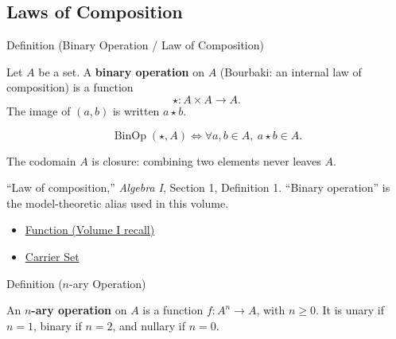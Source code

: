 
\subsection{Laws of Composition}
\label{sec:laws-of-composition}

\begin{definitionbox}{Definition (Binary Operation / Law of Composition)}
\begin{definition}
\label{def:binop}
Let $A$ be a set. A \textbf{binary operation} on $A$ (Bourbaki: an internal
law of composition) is a function
\[
  \star:A\times A\to A.
\]
The image of $(a,b)$ is written $a\star b$.
\end{definition}
\end{definitionbox}

\begin{remark*}
\[
\operatorname{BinOp}(\star,A)\Longleftrightarrow
\forall a,b\in A,\ a\star b\in A.
\]
\end{remark*}

\begin{remark*}[Interpretation]
The codomain $A$ is closure: combining two elements never leaves $A$.
\end{remark*}

\begin{remark*}
``Law of composition,'' \textit{Algebra I}, Section 1, Definition 1.
``Binary operation'' is the model-theoretic alias used in this volume.
\end{remark*}

\begin{dependencies}
\begin{itemize}
  \item \hyperref[def:alg-function]{Function (Volume I recall)}
  \item \hyperref[def:carrier-set]{Carrier Set}
\end{itemize}
\end{dependencies}

\begin{definitionbox}{Definition ($n$-ary Operation)}
\begin{definition}
\label{def:nary-operation}
An \textbf{$n$-ary operation} on $A$ is a function $f:A^n\to A$, with
$n\geq 0$. It is unary if $n=1$, binary if $n=2$, and nullary if $n=0$.
\end{definition}
\end{definitionbox}

